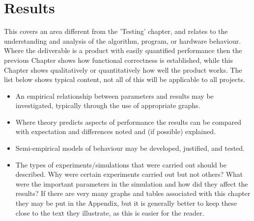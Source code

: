 \section{Results}
This covers an area different from the 'Testing'
chapter, and relates to the understanding and analysis
of the algorithm, program, or hardware behaviour.
Where the deliverable is a product with easily
quantified performance then the previous Chapter
shows how functional correctness is established,
while this Chapter shows qualitatively or
quantitatively how well the product works. The list
below shows typical content, not all of this will be
applicable to all projects.

\begin{itemize}
    \item An empirical relationship between
    parameters and results may be investigated,
    typically through the use of appropriate
    graphs.
    \item Where theory predicts aspects of
    performance the results can be compared
    with expectation and differences noted and (if
    possible) explained.
    \item Semi-empirical models of behaviour may be
    developed, justified, and tested.
    \item The types of experiments/simulations that
    were carried out should be described. Why
    were certain experiments carried out but not
    others? What were the important parameters
    in the simulation and how did they affect the
    results? If there are very many graphs and
    tables associated with this chapter they may
    be put in the Appendix, but it is generally
    better to keep these close to the text they
    illustrate, as this is easier for the reader.
\end{itemize}
